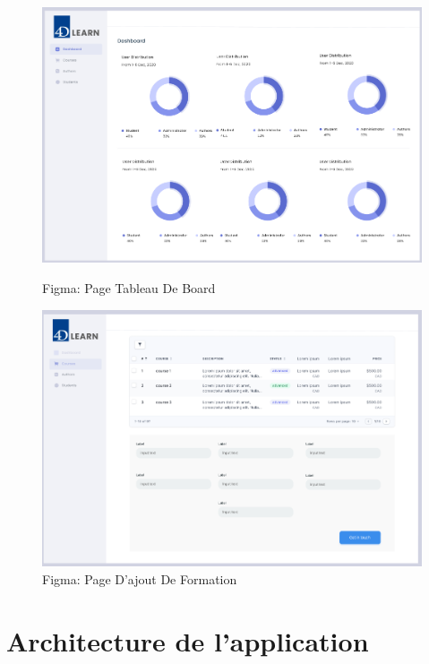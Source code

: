 \begin{figure}[H]
    \centering
    \begin{minipage}{0.45\textwidth}
        \centering
        \includegraphics[width=\textwidth]{Figures/figmaDashoboard.PNG}
        \caption{Figma: Page Tableau De Board}
    \end{minipage}
    \hfill
    \begin{minipage}{0.45\textwidth}
        \centering
        \includegraphics[width=\textwidth]{Figures/addCourseDashboard.png}
        \caption{Figma: Page D'ajout De Formation}
    \end{minipage}
    
\end{figure}

\section{Architecture de l’application}

